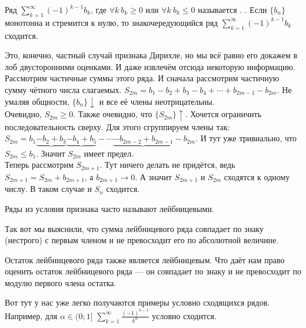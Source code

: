 \documentclass{article}
\begin{document}
\begin{itemize}
        \dfn Ряд $\sum\limits_{k=1}^\infty (-1)^{k-1}b_k$, где $\forall k~b_k\geqslant0$ или $\forall k~b_k\leqslant0$ называется .
        \thm {}. Если $\{b_n\}$ монотонна и стремится к нулю, то знакочередующийся ряд $\sum\limits_{k=1}^\infty (-1)^{k-1}b_k$ сходится.
        \begin{Proof}
            Это, конечно, частный случай признака Дирихле, но мы всё равно его докажем в лоб двусторонними оценками. И даже извлечём отсюда некоторую информацию.\\
            Рассмотрим частичные суммы этого ряда. И сначала рассмотрим частичную сумму чётного числа слагаемых. $S_{2m}=b_1-b_2+b_3-b_4+\cdots+b_{2m-1}-b_{2m}$. Не умаляя общности, $\{b_n\}\downarrow$ и все её члены неотрицательны.\\
            Очевидно, $S_{2m}\geqslant0$. Также очевидно, что $\{S_{2m}\}\uparrow$. Хочется ограничить последовательность сверху. Для этого сгруппируем члены так: $S_{2m}=b_1\underbrace{-b_2+b_3}\underbrace{-b_4+b_5}-\cdots\underbrace{-b_{2m-2}+b_{2m-1}}-b_{2m}$. И тут уже тривиально, что $S_{2m}\leqslant b_1$. Значит $S_{2m}$ имеет предел.\\
            Теперь рассмотрим $S_{2m+1}$. Тут ничего делать не придётся, ведь $S_{2m+1}=S_{2m}+b_{2m+1}$, а $b_{2m+1}\to0$. А значит $S_{2m+1}$ и $S_{2m}$ сходятся к одному числу. В таком случае и $S_{n}$ сходится.
        \end{Proof}
        \begin{Comment}
            Ряды из условия признака часто называют лейбницевыми.
        \end{Comment}
        \begin{Comment}
            Так вот мы выяснили, что сумма лейбницевого ряда совпадает по знаку (нестрого) с первым членом и не превосходит его по абсолютной величине.
        \end{Comment}
        \begin{Comment}
            Остаток лейбницевого ряда также является лейбницевым. Что даёт нам право оценить остаток лейбницевого ряда --- он совпадает по знаку и не превосходит по модулю первого члена остатка.
        \end{Comment}
        \begin{Example}
            Вот тут у нас уже легко получаются примеры условно сходящихся рядов. Например, для $\alpha\in(0;1]$ $\sum\limits_{k=1}^\infty\frac{(-1)^{k-1}}{k^\alpha}$ условно сходится.
        \end{Example}

\end{itemize}
\end{document}
